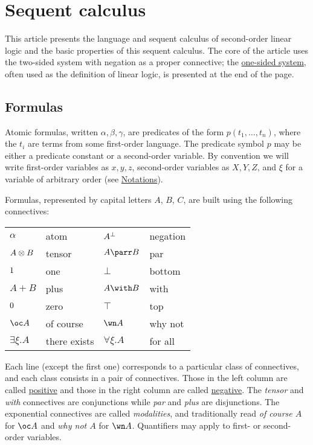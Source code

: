 \section{Sequent calculus}\label{sequent-calculus-1}

This article presents the language and sequent calculus of second-order
linear logic and the basic properties of this sequent calculus. The core
of the article uses the two-sided system with negation as a proper
connective; the \protect\hyperlink{One-sided_sequent_calculus}{one-sided
system}, often used as the definition of linear logic, is presented at
the end of the page.

\subsection{Formulas}\label{formulas}

Atomic formulas, written \(\alpha,\beta,\gamma\), are predicates of the
form \(p(t_1,\ldots,t_n)\), where the \(t_i\) are terms from some
first-order language. The predicate symbol \(p\) may be either a
predicate constant or a second-order variable. By convention we will
write first-order variables as \(x,y,z\), second-order variables as
\(X,Y,Z\), and \(\xi\) for a variable of arbitrary order (see
\url{Notations}).

Formulas, represented by capital letters \(A\), \(B\), \(C\), are built
using the following connectives:

\begin{longtable}[]{@{}llll@{}}
\toprule
\(\alpha\) & atom & \(A^\bot\) & negation\tabularnewline
\(A \otimes B\) & tensor & \(A \parr B\) & par\tabularnewline
\(1\) & one & \(\bot\) & bottom\tabularnewline
\(A \plus B\) & plus & \(A \with B\) & with\tabularnewline
\(0\) & zero & \(\top\) & top\tabularnewline
\(\oc A\) & of course & \(\wn A\) & why not\tabularnewline
\(\exists \xi.A\) & there exists & \(\forall \xi.A\) & for
all\tabularnewline
\bottomrule
\end{longtable}

Each line (except the first one) corresponds to a particular class of
connectives, and each class consists in a pair of connectives. Those in
the left column are called \href{positive_formula}{positive} and those
in the right column are called \href{negative_formula}{negative}. The
\emph{tensor} and \emph{with} connectives are conjunctions while
\emph{par} and \emph{plus} are disjunctions. The exponential connectives
are called \emph{modalities}, and traditionally read \emph{of course
\(A\)} for \(\oc A\) and \emph{why not \(A\)} for \(\wn A\). Quantifiers
may apply to first- or second-order variables.

